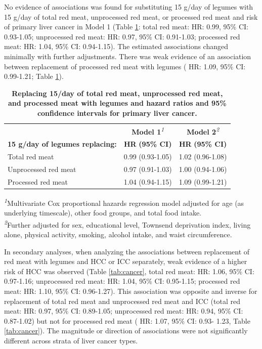 \documentclass[nutrients,article,submit,moreauthors,pdftex]{Definitions/mdpi}
\begin{document}
No evidence of associations was found for substituting 15 g/day of
legumes with 15 g/day of total red meat, unprocessed red meat, or
processed red meat and risk of primary liver cancer in Model 1 (Table
\ref{tab:main}: total red meat:
HR: 0.99, 95\% CI: 0.93-1.05;
unprocessed red meat:
HR: 0.97, 95\% CI: 0.91-1.03;
processed red meat:
HR: 1.04, 95\% CI: 0.94-1.15).
The estimated associations changed minimally with further adjustments.
There was weak evidence of an association between replacement of
processed red meat with legumes (
HR: 1.09, 95\% CI: 0.99-1.21;
Table \ref{tab:main}).

\begin{table}[b]
\caption{
\label{tab:main}\textbf{Replacing 15/day of total red meat, unprocessed red meat, and processed meat with legumes and hazard ratios and 95\% confidence intervals for primary liver cancer.}}
\fontsize{9.0pt}{10.8pt}\selectfont
\begin{tabular*}{1\linewidth}{@{\extracolsep{\fill}}lcc}
\toprule
 & {\bfseries \textbf{Model 1}}\textsuperscript{\textit{1}} & {\bfseries \textbf{Model 2}}\textsuperscript{\textit{2}} \\
\cmidrule(lr){2-2} \cmidrule(lr){3-3}
\textbf{15 g/day of legumes replacing:} & \textbf{HR} \textbf{(95\% CI)} & \textbf{HR} \textbf{(95\% CI)} \\
\midrule\addlinespace[2.5pt]
Total red meat & 0.99 (0.93-1.05) & 1.02 (0.96-1.08) \\
Unprocessed red meat & 0.97 (0.91-1.03) & 1.00 (0.94-1.06) \\
Processed red meat & 1.04 (0.94-1.15) & 1.09 (0.99-1.21) \\
\bottomrule
\end{tabular*}
\begin{minipage}{\linewidth}
\textsuperscript{\textit{1}}Multivariate Cox proportional hazards regression model adjusted for age (as underlying timescale), other food groups, and total food intake.\\
\textsuperscript{\textit{2}}Further adjusted for sex, educational level, Townsend deprivation index, living alone, physical activity, smoking, alcohol intake, and waist circumference.\\
\end{minipage}
\end{table}

In secondary analyses, when analyzing the associations between
replacement of red meat with legumes and HCC or ICC separately, weak
evidence of a higher risk of HCC was observed (Table \ref{tab:cancer},
total red meat:
HR: 1.06, 95\% CI: 0.97-1.16;
unprocessed red meat:
HR: 1.04, 95\% CI: 0.95-1.15;
processed red meat:
HR: 1.10, 95\% CI: 0.96-1.27).
This association was opposite and inverse for replacement of total red
meat and unprocessed red meat and ICC (total red meat:
HR: 0.97, 95\% CI: 0.89-1.05;
unprocessed red meat:
HR: 0.94, 95\% CI: 0.87-1.02)
but not for processed red meat (
HR: 1.07, 95\% CI: 0.93- 1.23,
Table \ref{tab:cancer}). The magnitude or direction of associations
were not significantly different across strata of liver cancer types.
\end{document}
